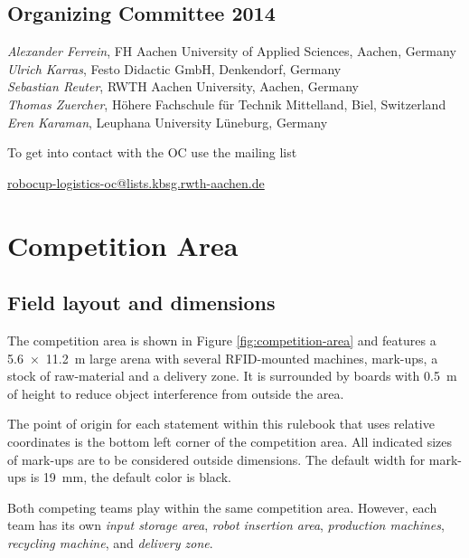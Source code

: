 \documentclass[12pt,twoside]{article}
\begin{document}
\subsection{Organizing Committee 2014} \label{sec:oc} 
\emph{Alexander Ferrein}, FH Aachen University of Applied Sciences,
Aachen, Germany\\
\emph{Ulrich Karras}, Festo Didactic GmbH, Denkendorf, Germany\\
\emph{Sebastian Reuter}, RWTH Aachen University, Aachen, Germany\\
\emph{Thomas Zuercher}, Höhere Fachschule für Technik Mittelland, Biel, Switzerland\\
\emph{Eren Karaman}, Leuphana University Lüneburg, Germany\\

\medskip

\noindent
To get into contact with the OC use the mailing list\\
\centerline{\url{robocup-logistics-oc@lists.kbsg.rwth-aachen.de}}




\section{Competition Area} \label{sec:area}


\subsection{Field layout and dimensions}
\label{sec:competition-area}

The competition area is shown in Figure \ref{fig:competition-area} and
features a \SI{5.6 x 11.2}{\metre} large arena with several
RFID-mounted machines, mark-ups, a stock of raw-material and a
delivery zone. It is surrounded by boards with \SI{0.5}{\metre} of
height to reduce object interference from outside the area.

The point of origin for each statement within this rulebook that uses
relative coordinates is the bottom left corner of the competition
area. All indicated sizes of mark-ups are to be considered outside
dimensions. The default width for mark-ups is \SI{19}{\milli\metre},
the default color is black.

Both competing teams play within the same competition area. However,
each team has its own \textit{input storage area}, \textit{robot
  insertion area}, \textit{production machines}, \textit{recycling
  machine}, and \textit{delivery zone}.
\end{document}
